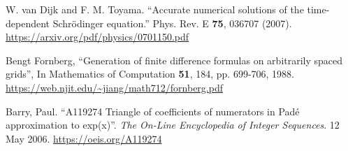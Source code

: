 \documentclass[11pt, a4paper]{article}
\newcommand{\schro}{Schr\"{o}dinger\xspace}
\begin{document}
\begin{thebibliography}{}
\setlength{\itemsep}{.2\itemsep}\setlength{\parsep}{.5\parsep}

 W. van Dijk and F. M. Toyama. ``Accurate numerical solutions of the time-dependent \schro equation.'' Phys. Rev. E \textbf{75}, 036707 (2007). \url{https://arxiv.org/pdf/physics/0701150.pdf}

Bengt Fornberg, ``Generation of finite difference formulas on arbitrarily spaced grids'', In Mathematics of Computation \textbf{51}, 184, pp. 699-706, 1988. \url{https://web.njit.edu/~jiang/math712/fornberg.pdf}

 Barry, Paul. ``A119274 Triangle of coefficients of numerators in Pad\'{e} approximation to exp(x)''. \textit{The On-Line Encyclopedia of Integer Sequences}. 12 May 2006. \url{https://oeis.org/A119274}

\end{thebibliography}
\end{document}

